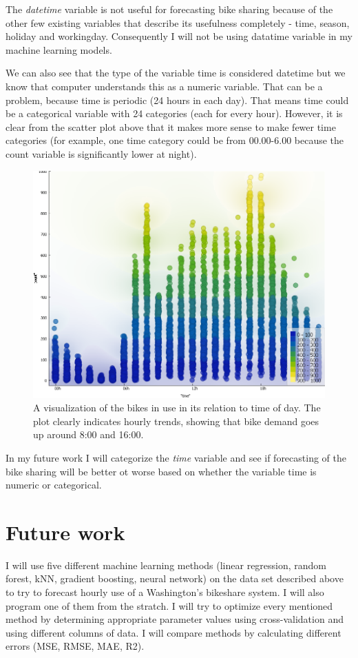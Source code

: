 \documentclass[12pt]{article}
\begin{document}
	The \textit{datetime} variable is not useful for forecasting bike sharing because of the other few existing variables that describe its usefulness completely - time, season, holiday and workingday.  Consequently I will not be using datatime variable in my machine learning models. 
	
	We can also see that the type of the variable time is considered datetime but we know that computer understands this as a numeric variable. That can be a problem, because time is periodic (24 hours in each day). That means time could be a categorical variable with 24 categories (each for every hour). However, it is clear from the scatter plot above that it makes more sense to make fewer time categories (for example, one time category could be from 00.00-6.00 because the count variable is significantly lower at night).
	
	
	\begin{figure}
		\centering
		\includegraphics[scale=0.4] {graf}
		\caption{\label{fig:1} A visualization of the bikes in use in its relation to time of day. The plot clearly indicates hourly trends, showing that bike demand goes up around 8:00 and 16:00.}
	\end{figure}
	
	In my future work I will categorize the \textit{time} variable and see if forecasting of the bike sharing will be better ot worse based on whether the variable time is numeric or categorical.
	
	
	
	\section{Future work}
	I will use five different machine learning methods (linear regression, random forest, kNN, gradient boosting, neural network) on the data set described above to try to forecast hourly use of a Washington's bikeshare system. I will also program one of them from the stratch. I will try to optimize every mentioned method by determining  appropriate parameter values using cross-validation and using different columns of data. I will compare methods by calculating different errors (MSE, RMSE, MAE, R2).
	

	

	
	
	
	
\end{document}
